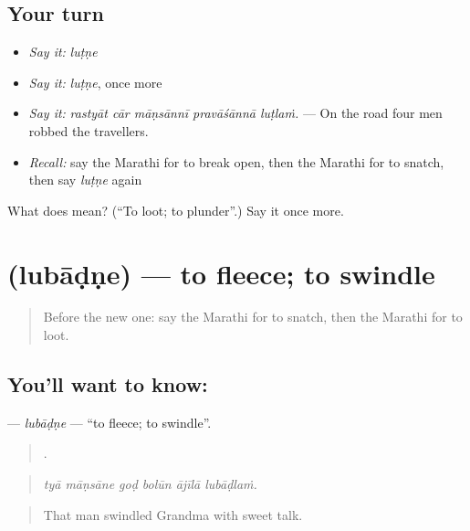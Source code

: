 \subsection*{Your turn}
\begin{itemize}
\raggedright
  \item \emph{Say it:} \emph{luṭṇe}
  \item \emph{Say it:} \emph{luṭṇe}, once more
  \item \emph{Say it:} \emph{rastyāt cār māṇsānnī pravāśānnā luṭlaṁ.} — On the road four men robbed the travellers.
  \item \emph{Recall:} say the Marathi for to break open, then the Marathi for to snatch, then say \emph{luṭṇe} again
\end{itemize}

\begin{tcolorbox}[breakable,colback=teal!4,colframe=teal!35!black,title={Before you move on}]
What does  mean? (\textquotedblleft{}To loot; to plunder\textquotedblright{}.) Say it once more.
\end{tcolorbox}
\section[\texorpdfstring{\mr{लुबाडणे} (lubāḍṇe)}{लुबाडणे (lubāḍṇe)}]{ (lubāḍṇe) — to fleece; to swindle}

\label{lesson:MR-C297-lubadne}



\begin{quote}
Before the new one: say the Marathi for to snatch, then the Marathi for to loot.
\end{quote}

\subsection*{You'll want to know: }
\textbf{} — \emph{lubāḍṇe} — \textquotedblleft{}to fleece; to swindle\textquotedblright{}.

\begin{quote}
     .
\end{quote}

\begin{quote}
\emph{tyā māṇsāne goḍ bolūn ājīlā lubāḍlaṁ.}
\end{quote}

\begin{quote}
That man swindled Grandma with sweet talk.
\end{quote}

